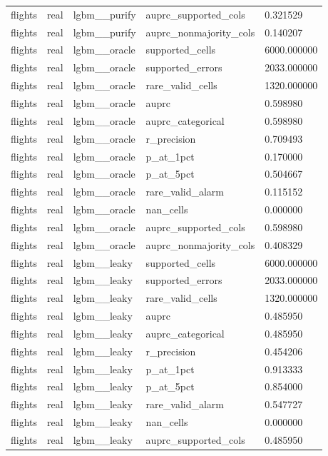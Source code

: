 \begin{tabular}{lllll}
flights & real & lgbm\_\_purify & auprc\_supported\_cols & 0.321529 \\
flights & real & lgbm\_\_purify & auprc\_nonmajority\_cols & 0.140207 \\
flights & real & lgbm\_\_oracle & supported\_cells & 6000.000000 \\
flights & real & lgbm\_\_oracle & supported\_errors & 2033.000000 \\
flights & real & lgbm\_\_oracle & rare\_valid\_cells & 1320.000000 \\
flights & real & lgbm\_\_oracle & auprc & 0.598980 \\
flights & real & lgbm\_\_oracle & auprc\_categorical & 0.598980 \\
flights & real & lgbm\_\_oracle & r\_precision & 0.709493 \\
flights & real & lgbm\_\_oracle & p\_at\_1pct & 0.170000 \\
flights & real & lgbm\_\_oracle & p\_at\_5pct & 0.504667 \\
flights & real & lgbm\_\_oracle & rare\_valid\_alarm & 0.115152 \\
flights & real & lgbm\_\_oracle & nan\_cells & 0.000000 \\
flights & real & lgbm\_\_oracle & auprc\_supported\_cols & 0.598980 \\
flights & real & lgbm\_\_oracle & auprc\_nonmajority\_cols & 0.408329 \\
flights & real & lgbm\_\_leaky & supported\_cells & 6000.000000 \\
flights & real & lgbm\_\_leaky & supported\_errors & 2033.000000 \\
flights & real & lgbm\_\_leaky & rare\_valid\_cells & 1320.000000 \\
flights & real & lgbm\_\_leaky & auprc & 0.485950 \\
flights & real & lgbm\_\_leaky & auprc\_categorical & 0.485950 \\
flights & real & lgbm\_\_leaky & r\_precision & 0.454206 \\
flights & real & lgbm\_\_leaky & p\_at\_1pct & 0.913333 \\
flights & real & lgbm\_\_leaky & p\_at\_5pct & 0.854000 \\
flights & real & lgbm\_\_leaky & rare\_valid\_alarm & 0.547727 \\
flights & real & lgbm\_\_leaky & nan\_cells & 0.000000 \\
flights & real & lgbm\_\_leaky & auprc\_supported\_cols & 0.485950 \\

\end{tabular}
